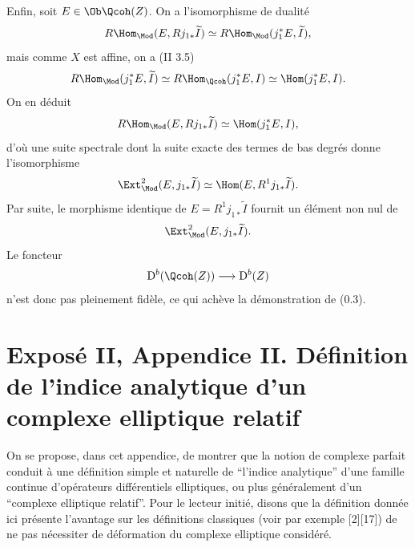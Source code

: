 \documentclass[11pt]{article}
\newcommand{\Parf}{\operatorname{Parf}}
\newcommand{\Spec}{\operatorname{Spec}}
\providecommand{\cF}{\mathscr F}
\providecommand{\cO}{\mathcal O}
\providecommand{\R}{\mathbb R}
\providecommand{\N}{\mathbb N}
\begin{document}
Enfin, soit $E\in\Ob\Qcoh(Z)$. On a l'isomorphisme de dualité
\[
 R\Hom_{\Mod}(E,Rj_{1*}\widetilde I)
 \simeq R\Hom_{\Mod}(j_1^*E,\widetilde I),
\]
mais comme $X$ est affine, on a (II 3.5)
\[
 R\Hom_{\Mod}(j_1^*E,\widetilde I)
 \simeq R\Hom_{\Qcoh}(j_1^*E,I)
 \simeq \Hom(j_1^*E,I).
\]
On en déduit
\[
 R\Hom_{\Mod}(E,Rj_{1*}\widetilde I)
 \simeq \Hom(j_1^*E,I),
\]
d'où une suite spectrale dont la suite exacte des termes de bas degrés donne l'isomorphisme
\[
 \Ext^2_{\Mod}(E,j_{1*}\widetilde I)
 \simeq \Hom(E,R^1j_{1*}\widetilde I).
\]
Par suite, le morphisme identique de $E=R^1j_{1*}\widetilde I$ fournit un élément non nul de
\[
 \Ext^2_{\Mod}(E,j_{1*}\widetilde I).
\]
Le foncteur
\[
 \mathrm D^b(\Qcoh(Z))\longrightarrow \mathrm D^b(Z)
\]
n'est donc pas pleinement fidèle, ce qui achève la démonstration de (0.3).



\providecommand{\cO}{\mathcal O}
\providecommand{\cE}{\mathscr E}
\providecommand{\cF}{\mathscr F}
\providecommand{\cG}{\mathscr G}
\providecommand{\cH}{\mathcal H}
\providecommand{\cL}{\mathscr L}
\providecommand{\cP}{\mathscr P}
\providecommand{\cM}{\mathscr M}
\providecommand{\cD}{\mathcal D}
\providecommand{\R}{\mathbb R}
\providecommand{\N}{\mathbb N}
\providecommand{\Diff}{\operatorname{Diff}}
\providecommand{\Homop}{\operatorname{Hom}}
\providecommand{\Spec}{\operatorname{Spec}}
\providecommand{\pr}{\operatorname{pr}}
\providecommand{\ind}{\operatorname{ind}}
\providecommand{\soft}{\operatorname{soft}}
\providecommand{\Ban}{\operatorname{Ban}}
\providecommand{\Lop}{\operatorname{L}}
\providecommand{\im}{\operatorname{Im}}
\providecommand{\Parf}{\operatorname{Parf}}
\providecommand{\id}{\operatorname{id}}

\newpage
\section*{Exposé II, Appendice II. Définition de l'indice analytique d'un complexe elliptique relatif}

On se propose, dans cet appendice, de montrer que la notion de complexe parfait conduit à une définition simple et naturelle de ``l'indice analytique'' d'une famille continue d'opérateurs différentiels elliptiques, ou plus généralement d'un ``complexe elliptique relatif''. Pour le lecteur initié, disons que la définition donnée ici présente l'avantage sur les définitions classiques (voir par exemple [2][17]) de ne pas nécessiter de déformation du complexe elliptique considéré.
\end{document}

